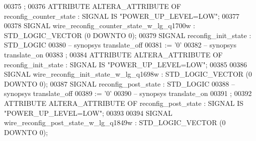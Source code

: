 \begin{DoxyCode}
{00375      ;
00376      \textcolor{keywordflow}{ATTRIBUTE} \textcolor{vhdlchar}{ALTERA_ATTRIBUTE} \textcolor{keywordflow}{OF} \textcolor{vhdlchar}{reconfig_counter_state} \textcolor{vhdlchar}{:} \textcolor{keywordflow}{SIGNAL} \textcolor{keywordflow}{IS} \textcolor{keyword}{"POWER\_UP\_LEVEL=LOW"};
00377 
00378      \textcolor{keywordflow}{SIGNAL}  \textcolor{vhdlchar}{wire_reconfig_counter_state_w_lg_q1700w}    \textcolor{vhdlchar}{:}   \textcolor{comment}{STD\_LOGIC\_VECTOR} \textcolor{vhdlchar}{(}\textcolor{vhdllogic}{}\textcolor{vhdllogic}{0} \textcolor{keywordflow}{DOWNTO} \textcolor{vhdllogic}{}\textcolor{vhdllogic}{0}\textcolor{vhdlchar}{)};
00379      \textcolor{keywordflow}{SIGNAL}  \textcolor{vhdlchar}{reconfig_init_state}    \textcolor{vhdlchar}{:}   \textcolor{comment}{STD\_LOGIC}
00380 \textcolor{keyword}{     -- synopsys translate\_off}
00381       \textcolor{vhdlchar}{:=} \textcolor{vhdlchar}{'}\textcolor{vhdllogic}{}\textcolor{vhdllogic}{0}\textcolor{vhdlchar}{'}
00382 \textcolor{keyword}{     -- synopsys translate\_on}
00383      ;
00384      \textcolor{keywordflow}{ATTRIBUTE} \textcolor{vhdlchar}{ALTERA_ATTRIBUTE} \textcolor{keywordflow}{OF} \textcolor{vhdlchar}{reconfig_init_state} \textcolor{vhdlchar}{:} \textcolor{keywordflow}{SIGNAL} \textcolor{keywordflow}{IS} \textcolor{keyword}{"POWER\_UP\_LEVEL=LOW"};
00385 
00386      \textcolor{keywordflow}{SIGNAL}  \textcolor{vhdlchar}{wire_reconfig_init_state_w_lg_q1698w}   \textcolor{vhdlchar}{:}   \textcolor{comment}{STD\_LOGIC\_VECTOR} \textcolor{vhdlchar}{(}\textcolor{vhdllogic}{}\textcolor{vhdllogic}{0} \textcolor{keywordflow}{DOWNTO} \textcolor{vhdllogic}{}\textcolor{vhdllogic}{0}\textcolor{vhdlchar}{)};
00387      \textcolor{keywordflow}{SIGNAL}  \textcolor{vhdlchar}{reconfig_post_state}    \textcolor{vhdlchar}{:}   \textcolor{comment}{STD\_LOGIC}
00388 \textcolor{keyword}{     -- synopsys translate\_off}
00389       \textcolor{vhdlchar}{:=} \textcolor{vhdlchar}{'}\textcolor{vhdllogic}{}\textcolor{vhdllogic}{0}\textcolor{vhdlchar}{'}
00390 \textcolor{keyword}{     -- synopsys translate\_on}
00391      ;
00392      \textcolor{keywordflow}{ATTRIBUTE} \textcolor{vhdlchar}{ALTERA_ATTRIBUTE} \textcolor{keywordflow}{OF} \textcolor{vhdlchar}{reconfig_post_state} \textcolor{vhdlchar}{:} \textcolor{keywordflow}{SIGNAL} \textcolor{keywordflow}{IS} \textcolor{keyword}{"POWER\_UP\_LEVEL=LOW"};
00393 
00394      \textcolor{keywordflow}{SIGNAL}  \textcolor{vhdlchar}{wire_reconfig_post_state_w_lg_q1849w}   \textcolor{vhdlchar}{:}   \textcolor{comment}{STD\_LOGIC\_VECTOR} \textcolor{vhdlchar}{(}\textcolor{vhdllogic}{}\textcolor{vhdllogic}{0} \textcolor{keywordflow}{DOWNTO} \textcolor{vhdllogic}{}\textcolor{vhdllogic}{0}\textcolor{vhdlchar}{)};
}
\end{DoxyCode}
